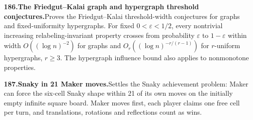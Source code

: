 \documentclass[11pt,a4paper]{article}
\begin{document}
  \par \begin{minipage}{\linewidth}
  \fontsize{10.5}{12.6}\selectfont\RaggedRight
  \hypertarget{result 186}{}
  {\bfseries\textcolor{muted}{186.}\enspace The Friedgut--Kalai graph and hypergraph threshold conjectures.}\enspace Proves the Friedgut--Kalai threshold-width conjectures for graphs and fixed-uniformity hypergraphs. For fixed $0<\varepsilon<1/2$, every nontrivial increasing relabeling-invariant property crosses from probability $\varepsilon$ to $1-\varepsilon$ within width $O((\log n)^{-2})$ for graphs and $O_r((\log n)^{-r/(r-1)})$ for $r$-uniform hypergraphs, $r\ge3$. The hypergraph influence bound also applies to nonmonotone properties.\par
  \end{minipage}\par\vspace{5pt}



  \par \begin{minipage}{\linewidth}
  \fontsize{10.5}{12.6}\selectfont\RaggedRight
  \hypertarget{result 187}{}
  {\bfseries\textcolor{muted}{187.}\enspace Snaky in 21 Maker moves.}\enspace Settles the Snaky achievement problem: Maker can force the six-cell Snaky shape within 21 of its own moves on the initially empty infinite square board. Maker moves first, each player claims one free cell per turn, and translations, rotations and reflections count as wins.\par
  \end{minipage}\par\vspace{5pt}
\end{document}
